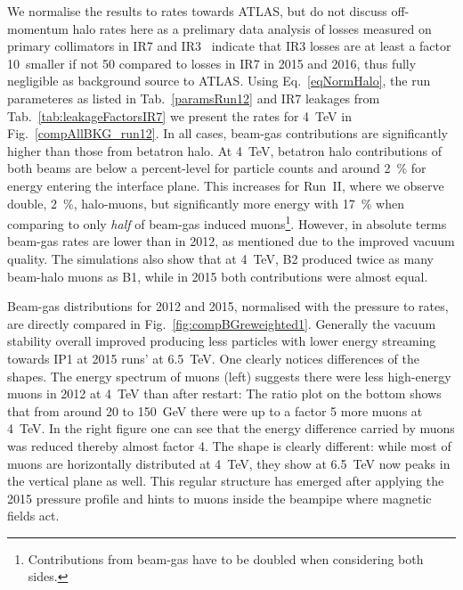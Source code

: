 We normalise the results to rates towards ATLAS, but do not discuss off-momentum halo rates here as a prelimary data analysis of losses measured on primary collimators in IR7 and IR3~\cite{belenOffMom} indicate that IR3 losses are at least a factor 10~smaller if not 50 compared to losses in IR7 in 2015 and 2016, thus fully negligible as background source to ATLAS. Using Eq.~\ref{eqNormHalo}, the run parameteres as listed in Tab.~\ref{paramsRun12} and IR7 leakages from Tab.~\ref{tab:leakageFactorsIR7} we present the rates for 4~TeV in Fig.~\ref{compAllBKG_run12}. In all cases, beam-gas contributions are significantly higher than those from betatron halo. At 4~TeV, betatron halo contributions of both beams are below a percent-level for particle counts and around 2~\% for energy entering the interface plane. This increases for Run~II, where we observe double, 2~\%, halo-muons, but significantly more energy with 17~\% when comparing to only \textit{half} of beam-gas induced muons\footnote{Contributions from beam-gas have to be doubled when considering both sides.}. However, in absolute terms beam-gas rates are lower than in 2012, as mentioned due to the improved vacuum quality. The simulations also show that at 4~TeV, B2 produced twice as many beam-halo muons as B1, while in 2015 both contributions were almost equal. 

Beam-gas distributions for 2012 and 2015, normalised with the pressure to rates, are directly compared in Fig.~\ref{fig:compBGreweighted1}. Generally the vacuum stability overall improved producing less particles with lower energy streaming towards IP1 at 2015 runs' at 6.5~TeV. One clearly notices differences of the shapes. The energy spectrum of muons (left) suggests there were less high-energy muons in 2012 at 4~TeV than after restart: The ratio plot on the bottom shows that from around 20 to 150~GeV there were up to a factor 5 more muons at 4~TeV. In the right figure one can see that the energy difference carried by muons was reduced thereby almost factor 4. The shape is clearly different: while most of muons are horizontally distributed at 4~TeV, they show at 6.5~TeV now peaks in the vertical plane as well. This regular structure has emerged after applying the 2015 pressure profile and hints to muons inside the beampipe where magnetic fields act.

